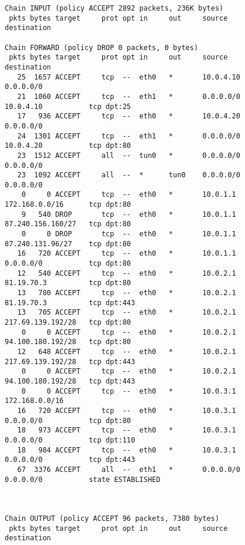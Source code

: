 \documentclass[a4paper,12pt]{article}
\begin{document}
\begin{Verbatim}
Chain INPUT (policy ACCEPT 2892 packets, 236K bytes)
 pkts bytes target     prot opt in     out     source               destination         

Chain FORWARD (policy DROP 0 packets, 0 bytes)
 pkts bytes target     prot opt in     out     source               destination         
   25  1657 ACCEPT     tcp  --  eth0   *       10.0.4.10            0.0.0.0/0           
   21  1060 ACCEPT     tcp  --  eth1   *       0.0.0.0/0            10.0.4.10           tcp dpt:25 
   17   936 ACCEPT     tcp  --  eth0   *       10.0.4.20            0.0.0.0/0           
   24  1301 ACCEPT     tcp  --  eth1   *       0.0.0.0/0            10.0.4.20           tcp dpt:80 
   23  1512 ACCEPT     all  --  tun0   *       0.0.0.0/0            0.0.0.0/0           
   23  1092 ACCEPT     all  --  *      tun0    0.0.0.0/0            0.0.0.0/0           
    0     0 ACCEPT     tcp  --  eth0   *       10.0.1.1             172.168.0.0/16      tcp dpt:80 
    9   540 DROP       tcp  --  eth0   *       10.0.1.1             87.240.156.160/27   tcp dpt:80 
    0     0 DROP       tcp  --  eth0   *       10.0.1.1             87.240.131.96/27    tcp dpt:80 
   16   720 ACCEPT     tcp  --  eth0   *       10.0.1.1             0.0.0.0/0           tcp dpt:80 
   12   540 ACCEPT     tcp  --  eth0   *       10.0.2.1             81.19.70.3          tcp dpt:80 
   13   780 ACCEPT     tcp  --  eth0   *       10.0.2.1             81.19.70.3          tcp dpt:443 
   13   705 ACCEPT     tcp  --  eth0   *       10.0.2.1             217.69.139.192/28   tcp dpt:80 
    0     0 ACCEPT     tcp  --  eth0   *       10.0.2.1             94.100.180.192/28   tcp dpt:80 
   12   648 ACCEPT     tcp  --  eth0   *       10.0.2.1             217.69.139.192/28   tcp dpt:443 
    0     0 ACCEPT     tcp  --  eth0   *       10.0.2.1             94.100.180.192/28   tcp dpt:443 
    0     0 ACCEPT     tcp  --  eth0   *       10.0.3.1             172.168.0.0/16      
   16   720 ACCEPT     tcp  --  eth0   *       10.0.3.1             0.0.0.0/0           tcp dpt:80 
   18   973 ACCEPT     tcp  --  eth0   *       10.0.3.1             0.0.0.0/0           tcp dpt:110 
   18   984 ACCEPT     tcp  --  eth0   *       10.0.3.1             0.0.0.0/0           tcp dpt:443 
   67  3376 ACCEPT     all  --  eth1   *       0.0.0.0/0            0.0.0.0/0           state ESTABLISHED 



Chain OUTPUT (policy ACCEPT 96 packets, 7380 bytes)
 pkts bytes target     prot opt in     out     source               destination
\end{Verbatim}
\end{document}
